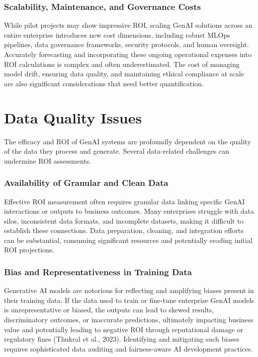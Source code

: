 \documentclass[10pt,twocolumn,letterpaper]{article}
\begin{document}
\subsubsection{Scalability, Maintenance, and Governance Costs}

While pilot projects may show impressive ROI, scaling GenAI solutions across an entire enterprise introduces new cost dimensions, including robust MLOps pipelines, data governance frameworks, security protocols, and human oversight. Accurately forecasting and incorporating these ongoing operational expenses into ROI calculations is complex and often underestimated. The cost of managing model drift, ensuring data quality, and maintaining ethical compliance at scale are also significant considerations that need better quantification.


\section{Data Quality Issues}


The efficacy and ROI of GenAI systems are profoundly dependent on the quality of the data they process and generate. Several data-related challenges can undermine ROI assessments.


\subsubsection{Availability of Granular and Clean Data}

Effective ROI measurement often requires granular data linking specific GenAI interactions or outputs to business outcomes. Many enterprises struggle with data silos, inconsistent data formats, and incomplete datasets, making it difficult to establish these connections. Data preparation, cleaning, and integration efforts can be substantial, consuming significant resources and potentially eroding initial ROI projections.


\subsubsection{Bias and Representativeness in Training Data}

Generative AI models are notorious for reflecting and amplifying biases present in their training data. If the data used to train or fine-tune enterprise GenAI models is unrepresentative or biased, the outputs can lead to skewed results, discriminatory outcomes, or inaccurate predictions, ultimately impacting business value and potentially leading to negative ROI through reputational damage or regulatory fines (Thukral et al., 2023). Identifying and mitigating such biases requires sophisticated data auditing and fairness-aware AI development practices.
\end{document}
